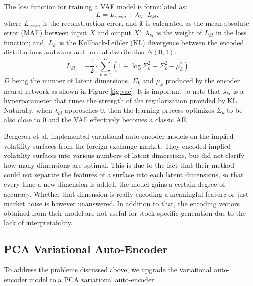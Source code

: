 \documentclass[format=sigconf]{acmart}
\begin{document}
The loss function for training a VAE model is formulated as: 
\begin{equation*} 
\label{eq:vae}
L = L_{recon} + \lambda_{kl}\cdot L_{kl},
\end{equation*}
where $L_{recon}$ is the reconstruction error, and it is calculated as the mean absolute error (MAE) between input $X$ and output $X'$; $\lambda_{kl}$ is the weight of $L_{kl}$ in the loss function; and, $L_{kl}$ is the Kullback-Leibler (KL) divergence between the encoded distributions and standard normal distribution $N(0,1)$:
\begin{equation*}
\label{eq:lkld}
L_{kl} = -\frac{1}{2} \cdot \sum_{k=1}^{D}(1 + \log\Sigma_{k}^{2} - \Sigma_{k}^{2} - \mu_{k}^{2})
\end{equation*}
$D$ being the number of latent dimensions, $\Sigma_{k}$ and $\mu_{k}$ produced by the encoder neural network as shown in Figure \ref{fig:vae}. It is important to note that $\lambda_{kl}$ is a hyperparameter that tunes the strength of the regularization provided by KL. Naturally, when  $\lambda_{kl}$ approaches 0, then the learning process optimizes $\Sigma_{k}$ to be also close to 0 and the VAE effectively becomes a classic AE.

Bergeron et al. \cite{bergeron2022variational} implemented variational auto-encoder models on the implied volatility surfaces from the foreign exchange market. They encoded implied volatility surfaces into various numbers of latent dimensions, but did not clarify how many dimensions are optimal. This is due to the fact that their method could not separate the features of a surface into each latent dimensions, so that every time a new dimension is added, the model gains a certain degree of accuracy. Whether that dimension is really encoding a meaningful feature or just market noise is however unanswered. In addition to that, the encoding vectors obtained from their model are not useful for stock specific generation due to the lack of interpretability.

\subsection{PCA Variational Auto-Encoder}
To address the problems discussed above, we upgrade the variational auto-encoder model to a PCA variational auto-encoder. 
\end{document}
